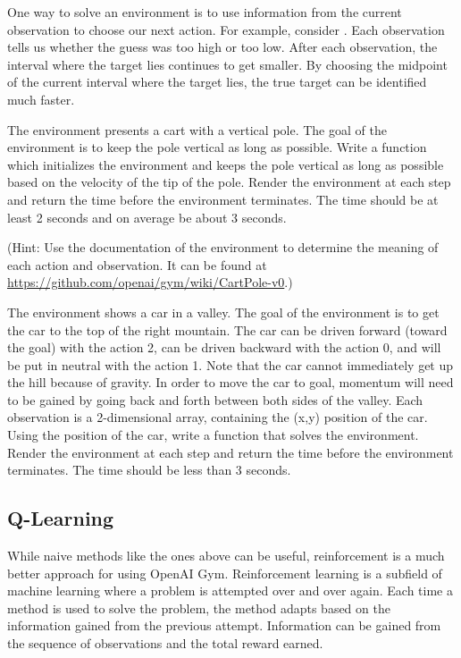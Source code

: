 One way to solve an environment is to use information from the current observation to choose our next action.
For example, consider .
Each observation tells us whether the guess was too high or too low.
After each observation, the interval where the target lies continues to get smaller.
By choosing the midpoint of the current interval where the target lies, the true target can be identified much faster.

\begin{problem}
The environment  presents a cart with a vertical pole.
The goal of the environment is to keep the pole vertical as long as possible.
Write a function  which initializes the environment and keeps the pole vertical as long as possible based on the velocity of the tip of the pole.
Render the environment at each step and return the time before the environment terminates.
The time should be at least 2 seconds and on average be about 3 seconds.

(Hint: Use the documentation of the environment to determine the meaning of each action and observation.
It can be found at \url{https://github.com/openai/gym/wiki/CartPole-v0}.)
\label{prob:cartpole}
\end{problem}

\begin{problem}
The environment  shows a car in a valley.
The goal of the environment is to get the car to the top of the right mountain.
The car can be driven forward (toward the goal) with the action 2, can be driven backward with the action 0, and will be put in neutral with the action 1.
Note that the car cannot immediately get up the hill because of gravity.
In order to move the car to goal, momentum will need to be gained by going back and forth between both sides of the valley.
Each observation is a 2-dimensional array, containing the (x,y) position of the car.
Using the position of the car, write a function  that solves the  environment.
Render the environment at each step and return the time before the environment terminates.
The time should be less than 3 seconds.

\label{prob:car}
\end{problem}

\subsection*{Q-Learning}
While naive methods like the ones above can be useful, reinforcement is a much better approach for using OpenAI Gym.
Reinforcement learning is a subfield of machine learning where a problem is attempted over and over again. Each time a method is used to solve the problem, the method adapts based on the information gained from the previous attempt.
Information can be gained from the sequence of observations and the total reward earned.

